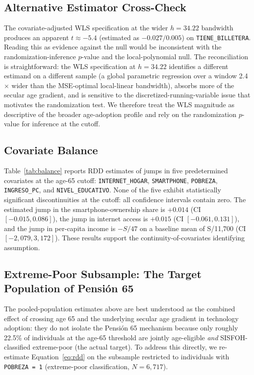 \documentclass[12pt]{article}
\begin{document}
\subsection{Alternative Estimator Cross-Check}

The covariate-adjusted WLS specification at the wider $h = 34.22$ bandwidth produces an apparent $t \approx -5.4$ (estimated as $-0.027/0.005$) on \texttt{TIENE\_BILLETERA}. Reading this as evidence against the null would be inconsistent with the randomization-inference $p$-value and the local-polynomial null. The reconciliation is straightforward: the WLS specification at $h = 34.22$ identifies a different estimand on a different sample (a global parametric regression over a window 2.4$\times$ wider than the MSE-optimal local-linear bandwidth), absorbs more of the secular age gradient, and is sensitive to the discretized-running-variable issue that motivates the randomization test. We therefore treat the WLS magnitude as descriptive of the broader age-adoption profile and rely on the randomization $p$-value for inference at the cutoff.

\subsection{Covariate Balance}

Table~\ref{tab:balance} reports RDD estimates of jumps in five predetermined covariates at the age-65 cutoff: \texttt{INTERNET\_HOGAR}, \texttt{SMARTPHONE}, \texttt{POBREZA}, \texttt{INGRESO\_PC}, and \texttt{NIVEL\_EDUCATIVO}. None of the five exhibit statistically significant discontinuities at the cutoff: all confidence intervals contain zero. The estimated jump in the smartphone-ownership share is $+0.014$ (CI $[-0.015, 0.086]$), the jump in internet access is $+0.015$ (CI $[-0.061, 0.131]$), and the jump in per-capita income is $-S/47$ on a baseline mean of S/11{,}700 (CI $[-2{,}079, 3{,}172]$). These results support the continuity-of-covariates identifying assumption.

\subsection{Extreme-Poor Subsample: The Target Population of Pensi\'on 65}
\label{sec:extreme_poor}

The pooled-population estimates above are best understood as the combined effect of crossing age 65 and the underlying secular age gradient in technology adoption: they do not isolate the Pensi\'on 65 mechanism because only roughly 22.5\% of individuals at the age-65 threshold are jointly age-eligible \emph{and} SISFOH-classified extreme-poor (the actual target). To address this directly, we re-estimate Equation~\ref{eq:rdd} on the subsample restricted to individuals with \texttt{POBREZA = 1} (extreme-poor classification, $N = 6{,}717$).
\end{document}
